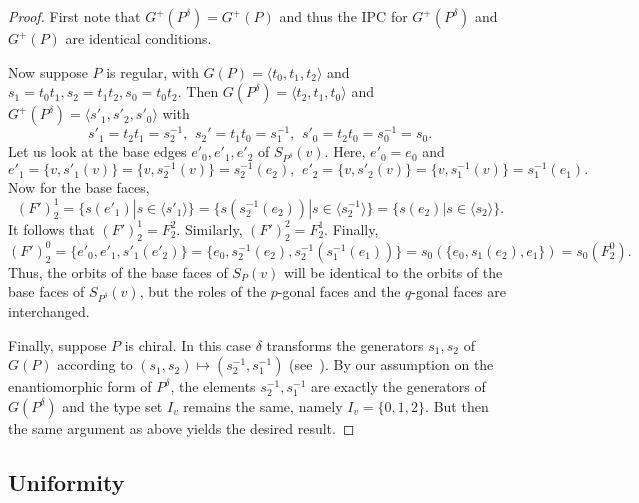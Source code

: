 \documentclass[12pt]{article}
\theoremstyle{definition}\newtheorem{definition}{Definition}[section]
\begin{document}
\begin{proof}
First note that $G^{+}(P^\delta)=G^{+}(P)$ and thus the IPC for $G^{+}(P^\delta)$ and $G^{+}(P)$ are identical conditions. 

Now suppose $P$ is regular, with $G(P) = \langle t_0, t_1, t_2 \rangle$ and  
$s_1 = t_0t_1, s_2 = t_1t_2, s_0 = t_0t_2$. 
Then $G(P^\delta) = \langle t_2, t_1, t_0 \rangle$ and 
$G^{+}(P^\delta)=\langle s'_1,s'_2,s'_0\rangle$ with 
$$s'_1 = t_2t_1 = s_2^{-1},\ \, s_2' = t_1t_0 = s_1^{-1},\, \ 
s'_0 = t_2t_0 = s_0^{-1} = s_0.$$ 
Let us look at the base edges $e'_0,e'_1,e'_2$ of $S_{P^\delta}(v)$. Here, $e'_0 = e_0$ and 
$$ e'_1 = \{v, s'_1(v)\} = \{v, s_2^{-1}(v)\} = s_2^{-1}(e_2), \ \, e'_2 = \{v, s'_2(v)\} = \{v, s_1^{-1}(v)\} = s_1^{-1}(e_1).$$ 
Now for the base faces, 
$${(F')}_2^1 = \{s(e'_1)| s \in \langle s'_1 \rangle\} = \{s(s_2^{-1}(e_2))|s\in \langle s_2^{-1} \rangle\} =  \{s(e_2)|s\in \langle s_2 \rangle\}.$$ 
It follows that ${(F')}_2^1 = F_2^2$. Similarly, ${(F')}_2^2 = F_2^1$. Finally, 
$${(F')}_2^0 = \{e'_0, e'_1, s'_1(e'_2)\} = \{e_0, s_2^{-1}(e_2), s_2^{-1}(s_1^{-1}(e_1))\} = s_0(\{e_0, s_1(e_2), e_1\}) = s_0(F_2^0).$$ 
Thus, the orbits of the base faces of ${S}_P(v)$ will be identical to the orbits of the base faces of ${S}_{P^\delta}(v)$, but the roles of the $p$-gonal faces and the $q$-gonal faces are interchanged. 

Finally, suppose $P$ is chiral. In this case $\delta$ transforms the generators $s_1,s_2$ of $G(P)$ according to 
$(s_{1}, s_{2}) \mapsto (s_2^{-1},s_1^{-1})$ (see~\cite{Chiral 1}). By our assumption on the enantiomorphic form of $P^\delta$,
the elements $s_2^{-1},s_1^{-1}$ are exactly the generators of $G(P^\delta)$ and the type set $I_v$ remains the same, namely $I_v=\{0,1,2\}$. But then the same argument as above yields the desired result.  
\end{proof}

\subsection{Uniformity}
\label{uniformity}
\end{document}
